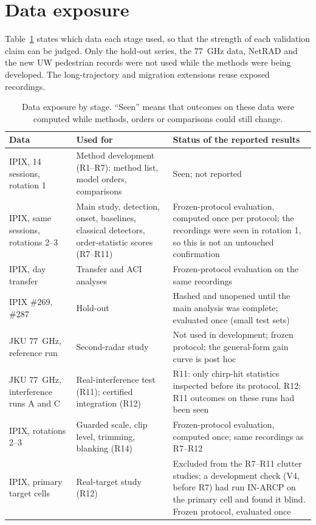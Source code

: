 \documentclass[10pt]{article}
\begin{document}
\section{Data exposure}
Table~\ref{tab:exposure} states which data each stage used, so that the strength of each validation claim can be judged. Only the hold-out series, the 77~GHz data, NetRAD and the new UW pedestrian records were not used while the methods were being developed. The long-trajectory and migration extensions reuse exposed recordings.
\begin{table}[h]
\centering\small
\caption{Data exposure by stage. ``Seen'' means that outcomes on these data were computed while methods, orders or comparisons could still change.}
\label{tab:exposure}
\begin{tabular}{p{4.3cm}p{5.2cm}p{6.2cm}}
\toprule
Data & Used for & Status of the reported results\\
\midrule
IPIX, 14 sessions, rotation 1 & Method development (R1--R7): method list, model orders, comparisons & Seen; not reported\\
IPIX, same sessions, rotations 2--3 & Main study, detection, onset, baselines, classical detectors, order-statistic scores (R7--R11) & Frozen-protocol evaluation, computed once per protocol; the recordings were seen in rotation 1, so this is not an untouched confirmation\\
IPIX, day transfer & Transfer and ACI analyses & Frozen-protocol evaluation on the same recordings\\
IPIX \#269, \#287 & Hold-out & Hashed and unopened until the main analysis was complete; evaluated once (small test sets)\\
JKU 77~GHz, reference run & Second-radar study & Not used in development; frozen protocol; the general-form gain curve is post hoc\\
JKU 77~GHz, interference runs A and C & Real-interference test (R11); certified integration (R12) & R11: only chirp-hit statistics inspected before its protocol. R12: R11 outcomes on these runs had been seen\\
IPIX, rotations 2--3 & Guarded scale, clip level, trimming, blanking (R14) & Frozen-protocol evaluation, computed once; same recordings as R7--R12\\
IPIX, primary target cells & Real-target study (R12) & Excluded from the R7--R11 clutter studies; a development check (V4, before R7) had run IN-ARCP on the primary cell and found it blind. Frozen protocol, evaluated once\\

\end{tabular}
\end{table}
\end{document}
